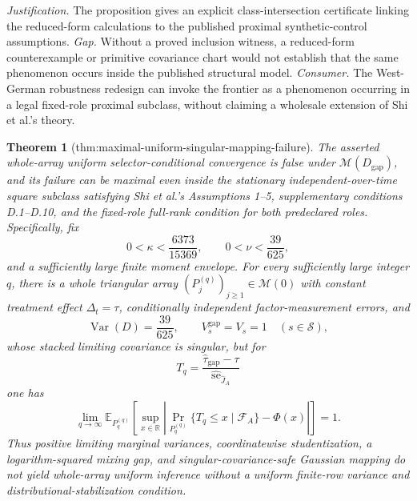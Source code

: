 \documentclass{article}
\newtheorem{theorem}{Theorem}
\begin{document}
\par\smallskip\noindent \textit{Justification.} The proposition gives an explicit class-intersection certificate linking the reduced-form calculations to the published proximal synthetic-control assumptions. \textit{Gap.} Without a proved inclusion witness, a reduced-form counterexample or primitive covariance chart would not establish that the same phenomenon occurs inside the published structural model. \textit{Consumer.} The West-German robustness redesign can invoke the frontier as a phenomenon occurring in a legal fixed-role proximal subclass, without claiming a wholesale extension of Shi et al.'s theory.

\begin{theorem}[thm:maximal-uniform-singular-mapping-failure]\label{thm:maximal-uniform-singular-mapping-failure}
The asserted whole-array uniform selector-conditional convergence is false under \(\mathcal M(D_{\mathrm{gap}})\), and its failure can be maximal even inside the stationary independent-over-time square subclass satisfying Shi et al.'s Assumptions 1--5, supplementary conditions D.1--D.10, and the fixed-role full-rank condition for both predeclared roles.  Specifically, fix
\[
 0<\kappa<\frac{6373}{15369},\qquad
 0<\nu<\frac{39}{625},
\]
and a sufficiently large finite moment envelope.  For every sufficiently large integer \(q\), there is a whole triangular array \((P_j^{(q)})_{j\geq1}\in\mathcal M(0)\) with constant treatment effect \(\Delta_t=\tau\), conditionally independent factor-measurement errors, and
\[
 \operatorname{Var}(D)=\frac{39}{625},\qquad
 V_s^{\mathrm{gap}}=V_s=1\quad(s\in\mathcal S),
\]
whose stacked limiting covariance is singular, but for
\[
 T_q=
 \frac{\widehat\tau_{\mathrm{gap}}-\tau}
      {\widehat{\operatorname{se}}_{\widehat J_A}}
\]
one has
\[
 \lim_{q\to\infty}
 \mathbb E_{P_q^{(q)}}\!\left[
  \sup_{x\in\mathbb R}
  \left|
   \Pr_{P_q^{(q)}}\{T_q\leq x\mid\mathcal F_A\}-\Phi(x)
  \right|
 \right]=1.
\]
Thus positive limiting marginal variances, coordinatewise studentization, a logarithm-squared mixing gap, and singular-covariance-safe Gaussian mapping do not yield whole-array uniform inference without a uniform finite-row variance and distributional-stabilization condition.
\end{theorem}
\end{document}
